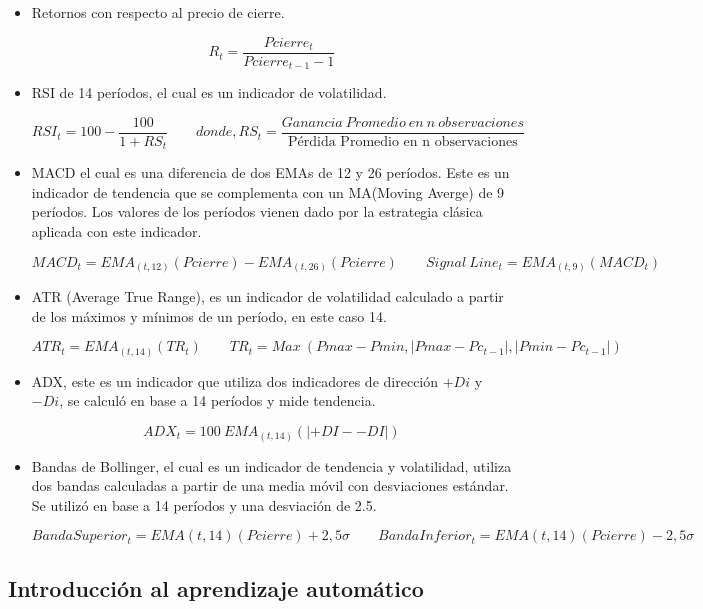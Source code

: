 \documentclass[a4paper,12pt]{Latex/Classes/PhDthesisPSnPDF}
\begin{document}
\begin{itemize}
\item Retornos con respecto al precio de cierre.

$$ R_{t} = \frac{Pcierre_{t}}{Pcierre_{t-1}-1}$$

\item RSI de 14 períodos, el cual es un indicador de volatilidad.

$$ RSI_{t} = 100 - \frac{100}{1 + RS_{t}} \qquad 
donde, RS_{t} = \frac{Ganancia\ Promedio\ en\ n\ observaciones}{\mbox{Pérdida Promedio en n observaciones}}$$

\item MACD el cual es una diferencia de dos EMAs de 12 y 26 períodos. Este es un indicador de tendencia que se complementa con un MA(Moving Averge) de 9 períodos. Los valores de los períodos vienen dado por la estrategia clásica aplicada con este indicador.

$$ MACD_{t} =  EMA_{(t, 12)}(Pcierre) - EMA_{(t, 26)}(Pcierre) \qquad
Signal\ Line_{t} = EMA_{(t, 9)}(MACD_{t}) $$

\item ATR (Average True Range), es un indicador de volatilidad calculado a partir de los máximos y mínimos de un período, en este caso 14.

$$ ATR_{t} =  EMA_{(t, 14)}(TR_{t}) \qquad
TR_{t} = Max\ (Pmax - Pmin, |Pmax - Pc_{t-1}|, |Pmin - Pc_{t-1}|)$$

\item ADX, este es un indicador que utiliza dos indicadores de dirección $+Di$ y $-Di$, se calculó en base a 14 períodos y mide tendencia.

$$ ADX_{t} =  100\ EMA_{(t, 14)}(|+DI - -DI|)$$

\item Bandas de Bollinger, el cual es un indicador de tendencia y volatilidad, utiliza dos bandas calculadas a partir de una media móvil con desviaciones estándar. Se utilizó en base a 14 períodos y una desviación de 2.5.

$$ Banda Superior_{t} = EMA{(t, 14)}(Pcierre) + 2,5\sigma \qquad 
Banda Inferior_{t} = EMA{(t, 14)}(Pcierre) - 2,5\sigma $$

\end{itemize}

\subsection{Introducción al aprendizaje automático}
\end{document}
